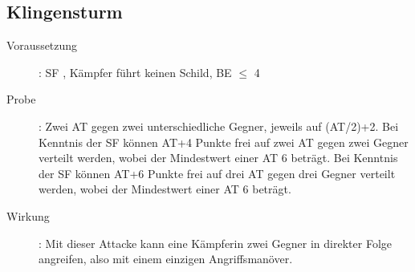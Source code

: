 \subsection{Klingensturm}
\label{aktion.klingensturm}
\begin{description}
    \item[Voraussetzung]:
        SF , Kämpfer führt keinen Schild, BE\textrm{ ${\leq}$ }4
    \item[Probe]:
        Zwei AT gegen zwei unterschiedliche Gegner, jeweils auf (AT/2)+2.\newline
        Bei Kenntnis der SF  können AT+4 Punkte frei auf zwei AT gegen zwei Gegner verteilt werden, wobei der Mindestwert einer AT 6 beträgt.\newline
        Bei Kenntnis der SF  können AT+6 Punkte frei auf drei AT gegen drei Gegner verteilt werden, wobei der Mindestwert einer AT 6 beträgt.
    \item[Wirkung]:
        Mit dieser Attacke kann eine Kämpferin zwei Gegner in direkter Folge angreifen, also mit einem einzigen Angriffsmanöver.
\end{description}
